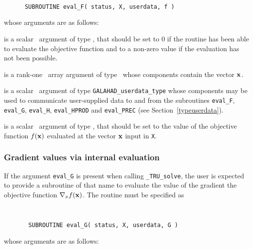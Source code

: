 \documentclass{galahad}
\newcommand{\packagename}{TRU}
\newcommand{\fullpackagename}{\libraryname\_\packagename}
\newcommand{\solver}{{\tt \fullpackagename\_solve}}
\begin{document}
\def\baselinestretch{0.8}
{\tt
\begin{verbatim}
      SUBROUTINE eval_F( status, X, userdata, f )
\end{verbatim}
}
\def\baselinestretch{1.0}
\noindent whose arguments are as follows:

\begin{description}
 is a scalar \intentout\ argument of type \integer,
that should be set to 0 if the routine has been able to evaluate
the objective function
and to a non-zero value if the evaluation has not been possible.

 is a rank-one \intentin\ array argument of type \realdp\
whose components contain the vector ${\mathbf{x}}$.

 is a scalar \intentinout\ argument of type
{\tt GALAHAD\_userdata\_type} whose components may be used
to communicate user-supplied data to and from the
subroutines {\tt eval\_F}, {\tt eval\_G},
{\tt eval\_H}, {\tt eval\_HPROD} and {\tt eval\_PREC}
(see Section~\ref{typeuserdata}).

 is a scalar \intentout\ argument of type \realdp,
that should be set to the value of the objective function $f({\mathbf{x}})$
evaluated at the vector ${\mathbf{x}}$ input in {\tt X}.

\end{description}


\subsubsection{Gradient values via internal evaluation\label{gfv}}

If the argument {\tt eval\_G} is present when calling \solver, the
user is expected to provide a subroutine of that name to evaluate the
value of the gradient the objective function $\nabla_x f({\mathbf{x}})$.
The routine must be specified as

\def\baselinestretch{0.8}
{\tt
\begin{verbatim}
       SUBROUTINE eval_G( status, X, userdata, G )
\end{verbatim} }
\def\baselinestretch{1.0}
\noindent whose arguments are as follows:
\end{document}
